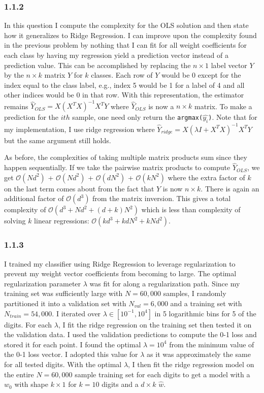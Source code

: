 \documentclass[12pt]{amsart}
\begin{document}
\subsubsection*{1.1.2}

In this question I compute the complexity for the OLS solution and then state how it generalizes to Ridge Regression.  I can improve upon the complexity found in the previous problem by nothing that I can fit for all weight coefficients for each class by having my regression yield a prediction vector instead of a prediction value.  This can be accomplished by replacing the $n \times 1$ label vector $Y$ by the $n \times k$ matrix $Y$ for $k$ classes.  Each row of $Y$ would be 0 except for the index equal to the class label, e.g., index 5 would be 1 for a label of 4 and all other indices would be 0 in that row.  With this representation, the estimator remains $\hat{Y}_{OLS} = X(X^T X)^{-1}X^T Y$ where $\hat{Y}_{OLS}$ is now a $n \times k$ matrix.  To make a prediction for the $ith$ sample, one need only return the {\tt argmax($\hat{y_i}$)}.  Note that for my implementation, I use ridge regression where $\hat{Y}_{ridge} = X(\lambda I + X^T X)^{-1}X^T Y$ but the same argument still holds.

As before, the complexities of taking multiple matrix products sum since they happen sequentially.  If we take the pairwise matrix products to compute $\hat{Y}_{OLS}$, we get $\mathcal{O}(Nd^2)$ + $\mathcal{O}(Nd^2)$ + $\mathcal{O}(dN^2)$ + $\mathcal{O}(kN^2)$ where the extra factor of $k$ on the last term comes about from the fact that $Y$ is now $n \times k$.  There is again an additional factor of $\mathcal{O}(d^3)$ from the matrix inversion.  This gives a total complexity of $\mathcal{O}(d^3 + Nd^2 + (d+k)N^2)$ which is less than complexity of solving $k$ linear regressions: $\mathcal{O}(kd^3 + kdN^2 + kNd^2)$.

\subsubsection*{1.1.3}

I trained my classifier using Ridge Regression to leverage regularization to prevent my weight vector coefficients from becoming to large.  The optimal regularization parameter $\lambda$ was fit for along a regularization path.  Since my training set was sufficiently large with $N = 60,000$ samples, I randomly partitioned it into a validation set with $N_{val} = 6,000$ and a training set with $N_{train} = 54,000$.  I iterated over $\lambda \in [10^{-1},10^{4}]$ in 5 logarithmic bins for 5 of the digits.  For each $\lambda$, I fit the ridge regression on the training set then tested it on the validation data.  I used the validation predictions to compute the 0-1 loss and stored it for each point.  I found the optimal $\lambda = 10^4$ from the minimum value of the 0-1 loss vector.  I adopted this value for $\lambda$ as it was approximately the same for all tested digits.  With the optimal $\lambda$, I then fit the ridge regression model on the entire $N = 60,000$ sample training set for each digits to get a model with a $w_0$ with shape $k \times 1$ for $k = 10$ digits and a $d \times k$ $\hat{w}$.  
\end{document}
